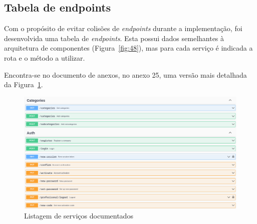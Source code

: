 \newpage

\subsection{Tabela de endpoints}
Com o propósito de evitar colisões de \textit{endpoints} durante a implementação, foi desenvolvida uma tabela de \textit{endpoints}. Esta possui dados semelhantes à arquitetura de componentes (Figura~\ref*{fig:48}), mas para cada serviço é indicada a rota e o método a utilizar.

Encontra-se no documento de anexos, no anexo 25, uma versão mais detalhada da Figura~\ref*{docs_swagger}.



\begin{figure}[htb]
  \centering
  \includegraphics[width=\textwidth]{images/implementacao/api/swagger_intro.png}
  \caption{Listagem de serviços documentados}
  \label{docs_swagger}
\end{figure}

\newpage
